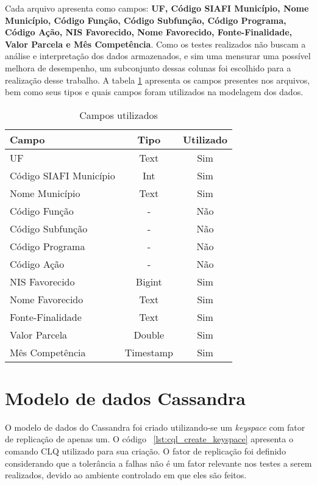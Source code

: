 Cada arquivo apresenta como campos: \textbf{UF, Código SIAFI Município, Nome Município, Código Função, Código Subfunção, Código Programa, Código Ação, NIS Favorecido, Nome Favorecido, Fonte-Finalidade, Valor Parcela e Mês Competência}. Como os testes realizados não buscam a análise e interpretação dos dados armazenados, e sim uma mensurar uma possível melhora de desempenho, um subconjunto dessas colunas foi escolhido para a realização desse trabalho. A tabela \ref{tab:colunas} apresenta os campos presentes nos arquivos, bem como seus tipos e quais campos foram utilizados na modelagem dos dados.

\begin{table}[]
	\centering
	\caption{Campos utilizados}
	\label{tab:colunas}
	\begin{tabular}{|l|c|c|}
		\hline
		\textbf{Campo}         & \textbf{Tipo} & \textbf{Utilizado} \\ \hline
		UF                     & Text          & Sim                \\ \hline
		Código SIAFI Município & Int           & Sim                \\ \hline
		Nome Município         & Text          & Sim                \\ \hline
		Código Função          & -             & Não                \\ \hline
		Código Subfunção       & -             & Não                \\ \hline
		Código Programa        & -             & Não                \\ \hline
		Código Ação            & -             & Não                \\ \hline
		NIS Favorecido         & Bigint        & Sim                \\ \hline
		Nome Favorecido        & Text          & Sim                \\ \hline
		Fonte-Finalidade       & Text          & Sim                \\ \hline
		Valor Parcela          & Double        & Sim                \\ \hline
		Mês Competência        & Timestamp     & Sim                \\ \hline
	\end{tabular}
\end{table}

\section{Modelo de dados Cassandra}
O modelo de dados do Cassandra foi criado utilizando-se um \emph{keyspace} com fator de replicação de apenas um. O código ~\ref{lst:cql_create_keyspace} apresenta o comando CLQ utilizado para sua criação. O fator de replicação foi definido considerando que a tolerância a falhas não é um fator relevante nos testes a serem realizados, devido ao ambiente controlado em que eles são feitos.

